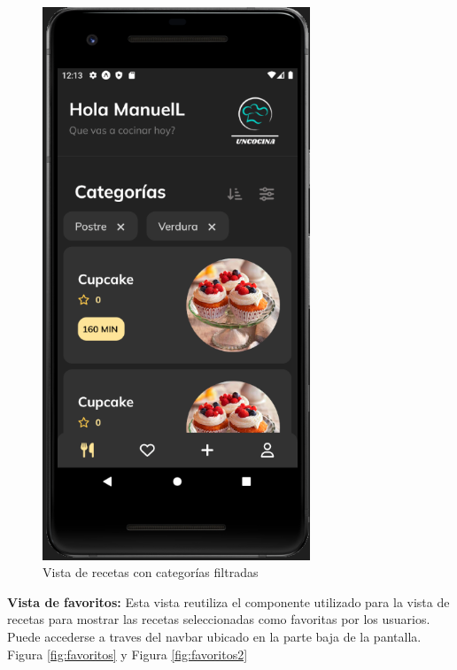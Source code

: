 \begin{figure}[!h]
  \centering
  \includegraphics[width=8cm, scale=1]{Images/Imagenes/recetas3.png}
  \caption{Vista de recetas con categorías filtradas}
  \label{fig:recetas3}
\end{figure}

\textbf{Vista de favoritos: }
Esta vista reutiliza el componente utilizado para la vista de recetas para mostrar las recetas seleccionadas como favoritas por los usuarios. Puede accederse a traves del navbar ubicado en la parte baja de la pantalla. Figura \ref{fig:favoritos} y Figura \ref{fig:favoritos2}\\

